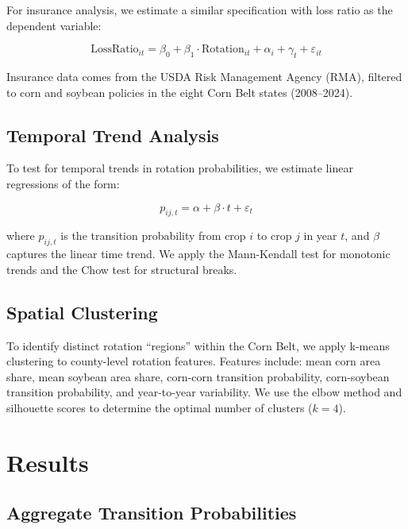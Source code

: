 \documentclass[12pt, a4paper]{article}
\begin{document}
For insurance analysis, we estimate a similar specification with loss ratio as the dependent variable:

\begin{equation}
\text{LossRatio}_{it} = \beta_0 + \beta_1 \cdot \text{Rotation}_{it} + \alpha_i + \gamma_t + \varepsilon_{it}
\end{equation}

Insurance data comes from the USDA Risk Management Agency (RMA), filtered to corn and soybean policies in the eight Corn Belt states (2008--2024).

\subsection{Temporal Trend Analysis}

To test for temporal trends in rotation probabilities, we estimate linear regressions of the form:

\begin{equation}
p_{ij,t} = \alpha + \beta \cdot t + \varepsilon_t
\end{equation}

where $p_{ij,t}$ is the transition probability from crop $i$ to crop $j$ in year $t$, and $\beta$ captures the linear time trend. We apply the Mann-Kendall test for monotonic trends and the Chow test for structural breaks.

\subsection{Spatial Clustering}

To identify distinct rotation ``regions'' within the Corn Belt, we apply k-means clustering to county-level rotation features. Features include: mean corn area share, mean soybean area share, corn-corn transition probability, corn-soybean transition probability, and year-to-year variability. We use the elbow method and silhouette scores to determine the optimal number of clusters ($k=4$).


\section{Results}
\label{sec:results}

\subsection{Aggregate Transition Probabilities}
\end{document}
